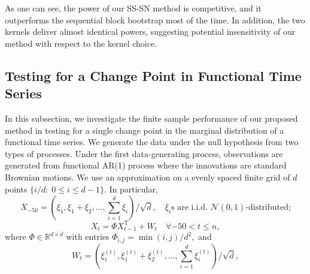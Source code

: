 \documentclass[11pt]{article}
\theoremstyle{plain}
\theoremstyle{definition}
\theoremstyle{remark}
\begin{document}
\noindent As one can see, the power of our SS-SN method is competitive, and it outperforms the sequential block bootstrap most of the time. In addition, the two kernels deliver almost identical powers, suggesting potential insensitivity of our method with respect to the kernel choice. 


\subsection{Testing for a Change Point in Functional Time Series}\label{sec:simulations_FDA}
In this subsection, we investigate the finite sample performance of our proposed method in testing for a single change point in the marginal distribution of a functional time series. We generate the data under the null hypothesis from two types of processes. Under the first data-generating process, observations are generated from functional AR(1) process where the innovations are standard Brownian motions. We use an approximation on a evenly spaced finite grid of $d$ points $\{i/d:\; 0\leq i \leq d-1\}.$ In particular,
$$X_{-50}=\left(\xi_1, \xi_1+\xi_2, \ldots, \sum_{i=1}^d \xi_i\right) / \sqrt{d}, \quad \xi_i\text{s are i.i.d. }\mathcal{N}(0,1)\text{-distributed;}
$$
$$
X_t= \Phi X_{t-1}^{\mathrm{T}}+W_t \quad \forall-50<t \leq n,
$$
where $\Phi \in \mathbb{R}^{d \times d}$ with entries $\Phi_{i, j}=\min (i, j) / d^2,$ and 
\begin{equation}\label{eqn:FDA_DGP1}
    W_t=\left(\xi_1^{(t)}, \xi_1^{(t)}+\xi_2^{(t)}, \ldots, \sum_{i=1}^d \xi_i^{(t)}\right) / \sqrt{d},
\end{equation}
\end{document}
